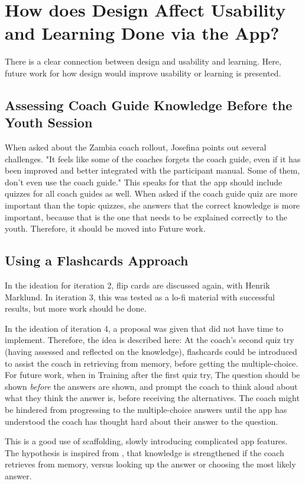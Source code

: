\section{How does Design Affect Usability and Learning Done via the App?}\label{sec:future-work-4}

There is a clear connection between design and usability and learning. Here, future work for how design would improve usability or learning is presented.

\subsection{Assessing Coach Guide Knowledge Before the Youth Session}
When asked about the Zambia coach rollout, Josefina points out several challenges. "It feels like some of the coaches forgets the coach guide, even if it has been improved and better integrated with the participant manual. Some of them, don't even use the coach guide." This speaks for that the app should include quizzes for all coach guides as well. When asked if the coach guide quiz are more important than the topic quizzes, she answers that the correct knowledge is more important, because that is the one that needs to be explained correctly to the youth. Therefore, it should be moved into Future work.

\subsection{Using a Flashcards Approach}
In the ideation for iteration 2, flip cards are discussed again, with Henrik Marklund. In iteration 3, this was tested as a lo-fi material with successful results, but more work should be done.

In the ideation of iteration 4, a proposal was given that did not have time to implement. Therefore, the idea is described here: At the coach's second quiz try (having assessed and reflected on the knowledge), flashcards could be introduced to assist the coach in retrieving from memory, before getting the multiple-choice. For future work, when in Training after the first quiz try, The question should be shown \textit{before} the answers are shown, and prompt the coach to think aloud about what they think the answer is, before receiving the alternatives. The coach might be hindered from progressing to the multiple-choice answers until the app has understood the coach has thought hard about their answer to the question.

This is a good use of scaffolding, slowly introducing complicated app features. The hypothesis is inspired from \cite{bjork}, that knowledge is strengthened if the coach retrieves from memory, versus looking up the answer or choosing the most likely answer.

